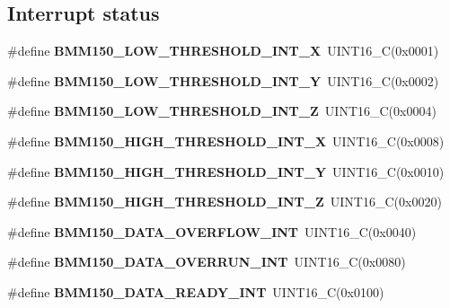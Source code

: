 \subsection*{Interrupt status}
\begin{DoxyCompactItemize}
\item 
\mbox{\label{group___b_m_m150_ga6b4a34979bafaf4f5919e7ce680c6594}} 
\#define {\bfseries B\+M\+M150\+\_\+\+L\+O\+W\+\_\+\+T\+H\+R\+E\+S\+H\+O\+L\+D\+\_\+\+I\+N\+T\+\_\+X}~U\+I\+N\+T16\+\_\+C(0x0001)
\item 
\mbox{\label{group___b_m_m150_ga6d41304b2bc0d6a614b20ef4a8df28ee}} 
\#define {\bfseries B\+M\+M150\+\_\+\+L\+O\+W\+\_\+\+T\+H\+R\+E\+S\+H\+O\+L\+D\+\_\+\+I\+N\+T\+\_\+Y}~U\+I\+N\+T16\+\_\+C(0x0002)
\item 
\mbox{\label{group___b_m_m150_gabb7931fd88fddf1812cdac483a16cf88}} 
\#define {\bfseries B\+M\+M150\+\_\+\+L\+O\+W\+\_\+\+T\+H\+R\+E\+S\+H\+O\+L\+D\+\_\+\+I\+N\+T\+\_\+Z}~U\+I\+N\+T16\+\_\+C(0x0004)
\item 
\mbox{\label{group___b_m_m150_gaab2697fd37ee109424df56b4a83592e2}} 
\#define {\bfseries B\+M\+M150\+\_\+\+H\+I\+G\+H\+\_\+\+T\+H\+R\+E\+S\+H\+O\+L\+D\+\_\+\+I\+N\+T\+\_\+X}~U\+I\+N\+T16\+\_\+C(0x0008)
\item 
\mbox{\label{group___b_m_m150_gaa2d11bef91a5ee5c846867a37aacc12e}} 
\#define {\bfseries B\+M\+M150\+\_\+\+H\+I\+G\+H\+\_\+\+T\+H\+R\+E\+S\+H\+O\+L\+D\+\_\+\+I\+N\+T\+\_\+Y}~U\+I\+N\+T16\+\_\+C(0x0010)
\item 
\mbox{\label{group___b_m_m150_ga34046beb28da9e25f319d78eab0cd856}} 
\#define {\bfseries B\+M\+M150\+\_\+\+H\+I\+G\+H\+\_\+\+T\+H\+R\+E\+S\+H\+O\+L\+D\+\_\+\+I\+N\+T\+\_\+Z}~U\+I\+N\+T16\+\_\+C(0x0020)
\item 
\mbox{\label{group___b_m_m150_ga472bff91fb59430c5185dc0a8e2bc6f4}} 
\#define {\bfseries B\+M\+M150\+\_\+\+D\+A\+T\+A\+\_\+\+O\+V\+E\+R\+F\+L\+O\+W\+\_\+\+I\+NT}~U\+I\+N\+T16\+\_\+C(0x0040)
\item 
\mbox{\label{group___b_m_m150_ga83a08bda67047a910e93c2608ffe1e54}} 
\#define {\bfseries B\+M\+M150\+\_\+\+D\+A\+T\+A\+\_\+\+O\+V\+E\+R\+R\+U\+N\+\_\+\+I\+NT}~U\+I\+N\+T16\+\_\+C(0x0080)
\item 
\mbox{\label{group___b_m_m150_gae80f53d4692065b51a8df454404fdf05}} 
\#define {\bfseries B\+M\+M150\+\_\+\+D\+A\+T\+A\+\_\+\+R\+E\+A\+D\+Y\+\_\+\+I\+NT}~U\+I\+N\+T16\+\_\+C(0x0100)
\end{DoxyCompactItemize}
